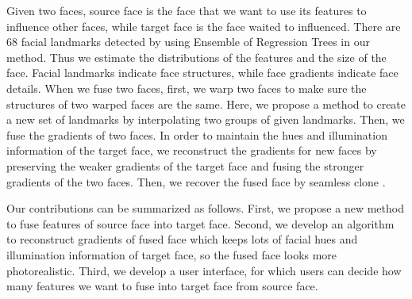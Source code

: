 Given two faces, source face is the face that we want to use its features to influence other faces, while target face is the face waited to influenced. There are 68 facial landmarks detected by using Ensemble of Regression Trees \cite{fld} in our method. Thus we estimate the distributions of the features and the size of the face. Facial landmarks indicate face structures, while face gradients indicate face details. When we fuse two faces, first, we warp two faces to make sure the structures of two warped faces are the same. Here, we propose a method  to create a new set of landmarks by interpolating two groups of given landmarks. Then, we fuse the gradients of two faces. In order to maintain the hues and illumination information of the target face, we reconstruct the gradients for new faces by preserving the weaker gradients of the target face and fusing the stronger gradients of the two faces. Then, we recover the fused face by seamless clone \cite{pie}.

Our contributions can be summarized as follows. First, we propose a new method to fuse features of source face into target face. Second, we develop an algorithm to reconstruct gradients of fused face which keeps lots of facial hues and illumination information of target face, so the fused face looks more photorealistic. Third, we develop a user interface, for which users can decide how many features we want to fuse into target face from source face.
